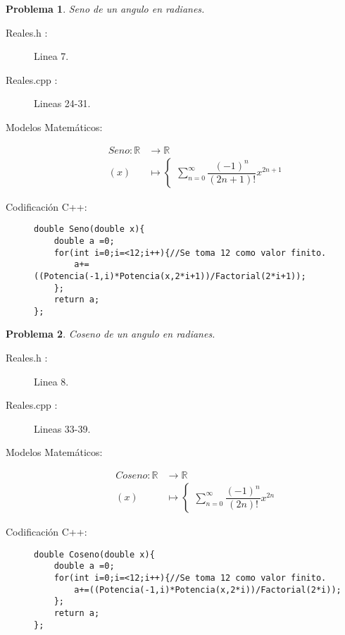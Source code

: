\documentclass{article}
\theoremstyle{plain}
\theoremstyle{definition}
\newtheorem{problem}{Problema}
\begin{document}
\begin{problem} \emph{Seno de un angulo en radianes.}\\
\begin{description}
\item[Reales.h :] Linea 7. \item[Reales.cpp :] Lineas 24-31.
\item[Modelos Matemáticos:]
\begin{align*}
Seno: \mathbb{R} &\to \mathbb{R}\\
(x) &\mapsto \begin{cases}
\sum_{n=0}^\infty \dfrac{(-1)^{n}}{(2n+1)!}x^{2n+1}
\end{cases}
\end{align*}
\item[Codificación \textsf{C++}:]\hfill
\begin{verbatim}
double Seno(double x){
    double a =0;
    for(int i=0;i=<12;i++){//Se toma 12 como valor finito.
        a+=((Potencia(-1,i)*Potencia(x,2*i+1))/Factorial(2*i+1));
    };
    return a;
};
\end{verbatim}
\end{description}
\end{problem}

\begin{problem} \emph{Coseno de un angulo en radianes.}\\
\begin{description}
\item[Reales.h :] Linea 8. \item[Reales.cpp :] Lineas 33-39.
\item[Modelos Matemáticos:]
\begin{align*}
Coseno: \mathbb{R} &\to \mathbb{R}\\
(x) &\mapsto \begin{cases}
\sum_{n=0}^\infty \dfrac{(-1)^{n}}{(2n)!}x^{2n}
\end{cases}
\end{align*}
\item[Codificación \textsf{C++}:]\hfill
\begin{verbatim}
double Coseno(double x){
    double a =0;
    for(int i=0;i=<12;i++){//Se toma 12 como valor finito.
        a+=((Potencia(-1,i)*Potencia(x,2*i))/Factorial(2*i));
    };
    return a;
};
\end{verbatim}
\end{description}
\end{problem}
\end{document}
